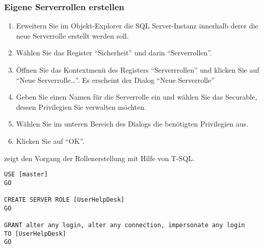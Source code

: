         \subsubsection{Eigene Serverrollen erstellen}
          \begin{enumerate}
            \item Erweitern Sie im Objekt-Explorer die SQL Server-Instanz
            innerhalb derer die neue Serverrolle erstellt werden soll.
            \item Wählen Sie das Register \enquote{Sicherheit} und darin
            \enquote{Serverrollen}.
            \item Öffnen Sie das Kontextmenü des Registers
            \enquote{Serverrrollen} und klicken Sie auf \enquote{Neue
            Serverrolle\ldots}. Es erscheint der Dialog \enquote{Neue
            Serverrolle}
            \item Geben Sie einen Namen für die Serverrolle ein und wählen Sie
            das Securable, dessen Privilegien Sie verwalten möchten.
            \item Wählen Sie im unteren Bereich des Dialogs die benötigten
            Privilegien aus.
            \item Klicken Sie auf \enquote{OK}.
          \end{enumerate}
           zeigt den Vorgang der Rollenerstellung mit Hilfe
          von T-SQL.
          \begin{lstlisting}[language=ms_sql,caption={Eine
          Serverrolle erstellen},label=sql19_02]
USE [master]
GO

CREATE SERVER ROLE [UserHelpDesk]
GO

GRANT alter any login, alter any connection, impersonate any login
TO [UserHelpDesk]
GO
        \end{lstlisting}
        \begin{literaturinternet}
          \item \cite{ee677627}
          \item \cite{ee677610}
        \end{literaturinternet}          
